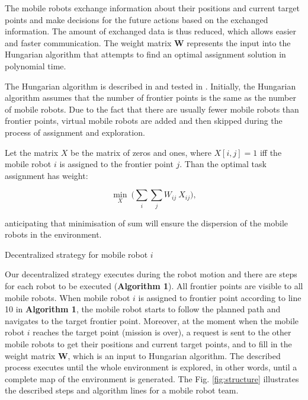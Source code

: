 The mobile robots exchange information about their positions and current target points and make decisions for the future actions based on the exchanged information. The amount of exchanged data is thus reduced, which allows easier and faster communication.
The weight matrix $\boldsymbol{W}$ represents the input into the Hungarian algorithm that attempts to find an optimal assignment solution in polynomial time.

The Hungarian algorithm is described in \cite{Kuhn1955} and tested in \cite{Kulich2015}. Initially, the Hungarian algorithm assumes that the number of frontier points is the same as the number of mobile robots. Due to the fact that there are usually fewer mobile robots than frontier points, virtual mobile robots are added and then skipped during the process of assignment and exploration.

Let the matrix $X$ be the matrix of zeros and ones, where $X[i,j]=1$ iff the mobile robot $i$ is assigned to the frontier point $j$.
Than the optimal task assignment has weight:

\begin{equation}
     {\min_{X}}\ \Big(\sum_{i} \sum_{j} W_{ij}\ X_{ij}\Big),
\end{equation}

anticipating that minimisation of sum will ensure the dispersion of the mobile robots in the environment. 

\begin{algorithm}[t!]
\label{algorithm1}
\caption{Decentralized strategy for mobile robot $i$}
\end{algorithm}


Our decentralized strategy executes during the robot motion and there are steps for each robot to be executed (\textbf{Algorithm 1}). All frontier points are visible to all mobile robots.
When mobile robot $i$ is assigned to frontier point according to line 10 in \textbf{Algorithm 1}, the mobile robot starts to follow the planned path and navigates to the target frontier point. Moreover, at the moment when the mobile robot $i$ reaches the target point (mission is over), a request is sent to the other mobile robots to get their positions and current target points, and to fill in the weight matrix $\boldsymbol{W}$, which is an input to Hungarian algorithm. The described process executes until the whole environment is explored, in other words, until a complete  map of the environment is generated. The Fig. \ref{fig:structure} illustrates the described steps and algorithm lines for a mobile robot team. 

